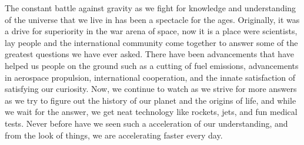 \documentclass[a4paper,12pt]{article}
\begin{document}
The constant battle against gravity as we fight for knowledge and understanding of the universe that we live in has been a spectacle for the ages. Originally, it was a drive for superiority in the war arena of space, now it is a place were scientists, lay people and the international community come together to answer some of the greatest questions we have ever asked. There have been advancements that have helped us people on the ground such as a cutting of fuel emissions, advancements in aerospace propulsion, international cooperation, and the innate satisfaction of satisfying our curiosity. Now, we continue to watch as we strive for more answers as we try to figure out the history of our planet and the origins of life, and while we wait for the answer, we get neat technology like rockets, jets, and fun medical tests. Never before have we seen such a acceleration of our understanding, and from the look of things, we are accelerating faster every day. 

\newpage
\printbibliography
\end{document}
